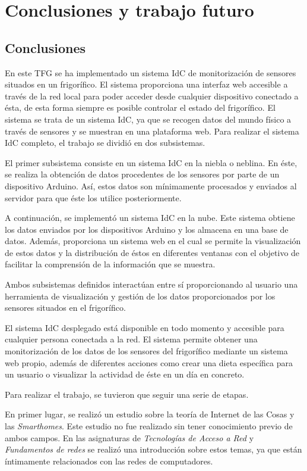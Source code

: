 \chapter{Conclusiones y trabajo futuro}

\section{Conclusiones}
En este TFG se ha implementado un sistema IdC de monitorización de sensores situados en un frigorífico. El sistema proporciona una interfaz web accesible a través de la red local para poder acceder desde cualquier dispositivo conectado a ésta, de esta forma siempre es posible controlar el estado del frigorífico. El sistema se trata de un sistema IdC, ya que se recogen datos del mundo físico a través de sensores y se muestran en una plataforma web. Para realizar el sistema IdC completo, el trabajo se dividió en dos subsistemas.

El primer subsistema consiste en un sistema IdC en la niebla o neblina. En éste, se realiza la obtención de datos procedentes de los sensores por parte de un dispositivo Arduino. Así, estos datos son mínimamente procesados y enviados al servidor para que éste los utilice posteriormente.

A continuación, se implementó un sistema IdC en la nube. Este sistema obtiene los datos enviados por los dispositivos Arduino y los almacena en una base de datos. Además, proporciona un sistema web en el cual se permite la visualización de estos datos y la distribución de éstos en diferentes ventanas con el objetivo de facilitar la comprensión de la información que se muestra.

Ambos subsistemas definidos interactúan entre sí proporcionando al usuario una herramienta de visualización y gestión de los datos proporcionados por los sensores situados en el frigorífico. 

El sistema IdC desplegado está disponible en todo momento y accesible para cualquier persona conectada a la red. El sistema permite obtener una monitorización de los datos de los sensores del frigorífico mediante un sistema web propio, además de diferentes acciones como crear una dieta específica para un usuario o visualizar la actividad de éste en un día en concreto.

Para realizar el trabajo, se tuvieron que seguir una serie de etapas.

En primer lugar, se realizó un estudio sobre la teoría de Internet de las Cosas y las \textit{Smarthomes}. Este estudio no fue realizado sin tener conocimiento previo de ambos campos. En las asignaturas de \textit{Tecnologías de Acceso a Red} y \textit{Fundamentos de redes} se realizó una introducción sobre estos temas, ya que están íntimamente relacionados con las redes de computadores.

